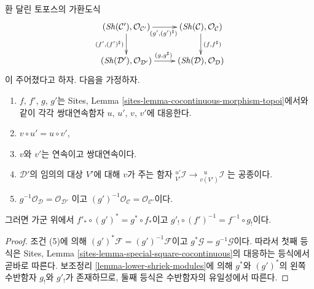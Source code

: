 \begin{lemma}
\label{lemma-special-square-cocontinuous}
환 달린 토포스의 가환도식
$$
\xymatrix{
(\Sh(\mathcal{C}'), \mathcal{O}_{\mathcal{C}'})
\ar[r]_{(g', (g')^\sharp)} \ar[d]_{(f', (f')^\sharp)} &
(\Sh(\mathcal{C}), \mathcal{O}_\mathcal{C}) \ar[d]^{(f, f^\sharp)} \\
(\Sh(\mathcal{D}'), \mathcal{O}_{\mathcal{D}'}) \ar[r]^{(g, g^\sharp)} &
(\Sh(\mathcal{D}), \mathcal{O}_\mathcal{D})
}
$$
이 주어졌다고 하자. 다음을 가정하자.
\begin{enumerate}
\item $f$, $f'$, $g$, $g'$는 Sites, Lemma
\ref{sites-lemma-cocontinuous-morphism-topoi}에서와 같이 각각
쌍대연속함자 $u$, $u'$, $v$, $v'$에 대응한다.
\item $v \circ u' = u \circ v'$,
\item $v$와 $v'$는 연속이고 쌍대연속이다.
\item $\mathcal{D}'$의 임의의 대상 $V'$에 대해 $v$가 주는 함자
${}^{u'}_{V'}\mathcal{I} \to {}^{\ \ \ u}_{v(V')}\mathcal{I}$
는 공종이다.
\item $g^{-1}\mathcal{O}_{\mathcal{D}} = \mathcal{O}_{\mathcal{D}'}$
이고 $(g')^{-1}\mathcal{O}_{\mathcal{C}} = \mathcal{O}_{\mathcal{C}'}$이다.
\end{enumerate}
그러면 가군 위에서 $f'_* \circ (g')^* = g^* \circ f_*$이고
$g'_! \circ (f')^{-1} = f^{-1} \circ g_!$이다.
\end{lemma}

\begin{proof}
조건 (5)에 의해 $(g')^*\mathcal{F} = (g')^{-1}\mathcal{F}$이고
$g^*\mathcal{G} = g^{-1}\mathcal{G}$이다. 따라서 첫째 등식은 Sites,
Lemma \ref{sites-lemma-special-square-cocontinuous}의 대응하는 등식에서
곧바로 따른다. 보조정리 \ref{lemma-lower-shriek-modules}에 의해
$g^*$와 $(g')^*$의 왼쪽 수반함자 $g_!$와 $g'_!$가 존재하므로,
둘째 등식은 수반함자의 유일성에서 따른다.
\end{proof}

